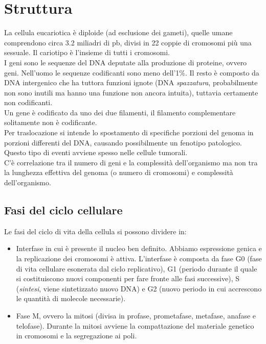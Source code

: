 \section{Struttura}
    \small
    La cellula eucariotica è diploide (ad esclusione dei gameti), quelle umane comprendono circa 3.2 miliadri di pb, divisi in 22 coppie di cromosomi più una sessuale. Il cariotipo è l'insieme di tutti i cromosomi.\\
    I geni sono le sequenze del DNA deputate alla produzione di proteine, ovvero geni. Nell'uomo le sequenze codificanti sono meno dell'1\%. 
    Il resto è composto da DNA intergenico che ha tuttora funzioni ignote (DNA \textit{spazzatura}, probabilmente non sono inutili ma hanno una funzione non ancora intuita), tuttavia certamente non codificanti.\\
    Un gene è codificato da uno dei due filamenti, il filamento complementare solitamente non è codificante.\\
    Per traslocazione si intende lo spostamento di specifiche porzioni del genoma in porzioni differenti del DNA, causando possibilmente un fenotipo patologico. Questo tipo di eventi avviene spesso nelle cellule tumorali.\\
    C'è correlazione tra il numero di geni e la complessità dell'organismo ma non tra la lunghezza effettiva del genoma (o numero di cromosomi) e complessità dell'organismo.
    
    \subsection{Fasi del ciclo cellulare}
        Le fasi del ciclo di vita della cellula si possono dividere in:
        \begin{itemize}
            \item Interfase in cui è presente il nucleo ben definito. Abbiamo espressione genica e la replicazione dei cromosomi è attiva. 
            L'interfase è composta da fase G0 (fase di vita cellulare esonerata dal ciclo replicativo), G1 (periodo durante il quale si costituiscono nuovi componenti per fare fronte alle fasi successive), S (\textit{sintesi}, viene sintetizzato nuovo DNA) e G2 (nuovo periodo in cui accrescono le quantità di molecole necessarie).\\
            \item Fase M, ovvero la mitosi (divisa in profase, prometafase, metafase, anafase e telofase). Durante la mitosi avviene la compattazione del materiale genetico in cromosomi e la segregazione ai poli.
        \end{itemize}
    
